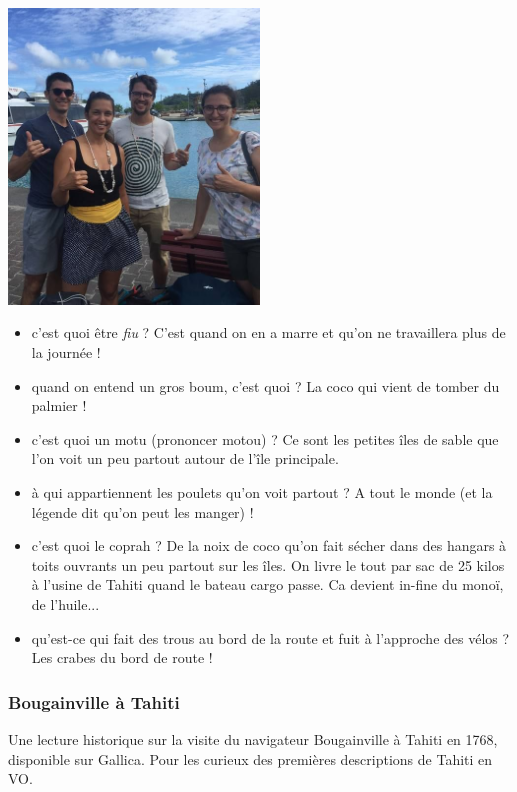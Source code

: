 \begin{center}
\includegraphics[width=0.5\textwidth]{images/20180820_hangloose.jpg}
\end{center}

\begin{itemize}
\tightlist
\item
  c'est quoi être \emph{fiu} ? C'est quand on en a marre et qu'on ne
  travaillera plus de la journée !
\item
  quand on entend un gros boum, c'est quoi ? La coco qui vient de tomber
  du palmier !
\item
  c'est quoi un motu (prononcer motou) ? Ce sont les petites îles de
  sable que l'on voit un peu partout autour de l'île principale.
\item
  à qui appartiennent les poulets qu'on voit partout ? A tout le monde
  (et la légende dit qu'on peut les manger) !
\item
  c'est quoi le coprah ? De la noix de coco qu'on fait sécher dans des
  hangars à toits ouvrants un peu partout sur les îles. On livre le tout
  par sac de 25 kilos à l'usine de Tahiti quand le bateau cargo passe.
  Ca devient in-fine du monoï, de l'huile...
\item
  qu'est-ce qui fait des trous au bord de la route et fuit à l'approche
  des vélos ? Les crabes du bord de route !
\end{itemize}

\hypertarget{bougainville-uxe0-tahiti}{%
\subsubsection{Bougainville à Tahiti}\label{bougainville-uxe0-tahiti}}

Une lecture historique sur la visite du navigateur Bougainville à Tahiti
en 1768, disponible sur Gallica. Pour les curieux des premières
descriptions de Tahiti en VO.

